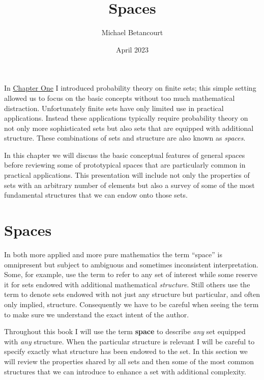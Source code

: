 \documentclass[
  letterpaper,
  DIV=11,
  numbers=noendperiod]{scrartcl}
\title{Spaces}
\author{Michael Betancourt}
\date{April 2023}
\renewcommand*\contentsname{Table of contents}
\newcommand\contentsname{Table of contents}
\begin{document}
\maketitle
\ifdefined\Shaded\renewenvironment{Shaded}{\begin{tcolorbox}[interior hidden, enhanced, boxrule=0pt, breakable, borderline west={3pt}{0pt}{shadecolor}, frame hidden, sharp corners]}{\end{tcolorbox}}\fi

\renewcommand*\contentsname{Table of contents}
{
\hypersetup{linkcolor=}
\setcounter{tocdepth}{3}
\tableofcontents
}
In
\href{https://betanalpha.github.io/assets/chapters_html/probability_on_finite_sets.html}{Chapter
One} I introduced probability theory on finite sets; this simple setting
allowed us to focus on the basic concepts without too much mathematical
distraction. Unfortunately finite sets have only limited use in
practical applications. Instead these applications typically require
probability theory on not only more sophisticated sets but also sets
that are equipped with additional structure. These combinations of sets
and structure are also known as \emph{spaces}.

In this chapter we will discuss the basic conceptual features of general
spaces before reviewing some of prototypical spaces that are
particularly common in practical applications. This presentation will
include not only the properties of sets with an arbitrary number of
elements but also a survey of some of the most fundamental structures
that we can endow onto those sets.

\hypertarget{spaces}{%
\section{Spaces}\label{spaces}}

In both more applied and more pure mathematics the term ``space'' is
omnipresent but subject to ambiguous and sometimes inconsistent
interpretation. Some, for example, use the term to refer to any set of
interest while some reserve it for sets endowed with additional
mathematical \emph{structure}. Still others use the term to denote sets
endowed with not just any structure but particular, and often only
implied, structure. Consequently we have to be careful when seeing the
term to make sure we understand the exact intent of the author.

Throughout this book I will use the term \textbf{space} to describe
\emph{any} set equipped with \emph{any} structure. When the particular
structure is relevant I will be careful to specify exactly what
structure has been endowed to the set. In this section we will review
the properties shared by all sets and then some of the most common
structures that we can introduce to enhance a set with additional
complexity.
\end{document}
